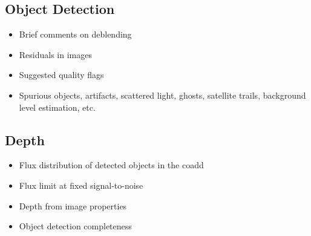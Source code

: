 




\subsection{Object Detection}

\begin{itemize}

\item Brief comments on deblending

\item Residuals in images

\item Suggested quality flags

\item Spurious objects, artifacts, scattered light, ghosts, satellite trails, background level estimation, etc.

\end{itemize}

\subsection{Depth}



\begin{itemize}

\item Flux distribution of detected objects in the coadd

\item Flux limit at fixed signal-to-noise

\item Depth from image properties

\item Object detection completeness

\end{itemize}

